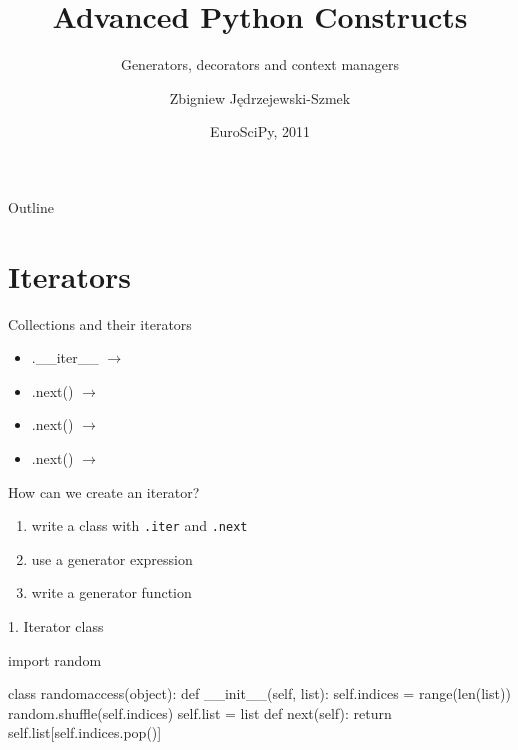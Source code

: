 \documentclass{beamer}
\title{Advanced Python Constructs}
\subtitle{Generators, decorators and context managers}
\author{Zbigniew Jędrzejewski-Szmek}
\date{EuroSciPy, 2011}
\newcommand{\lra}{\ensuremath{\longrightarrow}}
\begin{document}
\begin{frame}
  \titlepage
\end{frame}

\begin{frame}{Outline}
  \tableofcontents
\end{frame}

\section{Iterators}

\begin{frame}[fragile]{Collections and their iterators}
  \begin{itemize}
    \item
      \begin{semiverbatim}
        \pause.__iter__  \lra {}\hfill
      \end{semiverbatim}
      \pause
    \item
      .next() \lra {}
      \pause
    \item
      .next() \lra {}
      \pause
    \item
      .next() \lra {}
  \end{itemize}
\end{frame}

\begin{frame}[fragile]{How can we create an iterator?}

  \begin{enumerate}
    \item write a class with \verb|.iter| and \verb|.next|
    \item use a generator expression
    \item write a generator function
  \end{enumerate}
\end{frame}

\begin{frame}[fragile]{1. Iterator class}
  \begin{pycode}
    import random

    class randomaccess(object):
        def __init__(self, list):
            self.indices = range(len(list))
            random.shuffle(self.indices)
            self.list = list
        def next(self):
            return self.list[self.indices.pop()]
  \end{pycode}
\end{frame}
\end{document}
